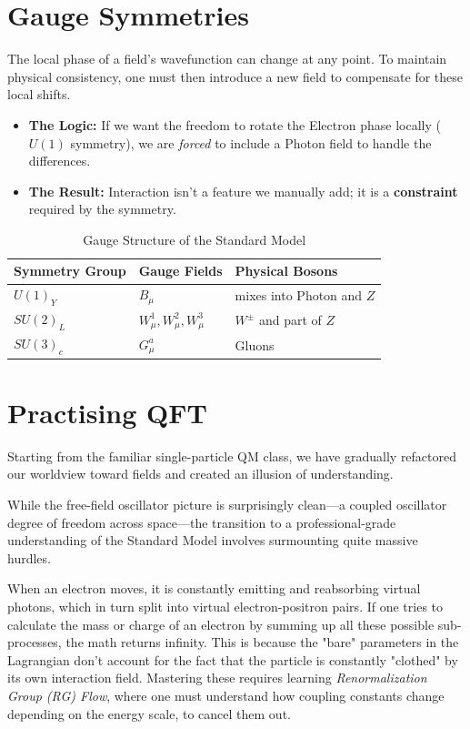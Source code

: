 \section{Gauge Symmetries}

The local phase of a field's wavefunction can change at any point.
To maintain physical consistency, one must then introduce a new field to compensate for these local shifts.

\begin{itemize}
    \item \textbf{The Logic:} If we want the freedom to rotate the Electron phase locally ($U(1)$ symmetry), we are \textit{forced} to include a Photon field to handle the differences.
    \item \textbf{The Result:} Interaction isn't a feature we manually add; it is a \textbf{constraint} required by the symmetry. 
\end{itemize}

\begin{table}[h!]
\centering
\begin{tabular}{|l|l|l|}
\hline
\textbf{Symmetry Group} & \textbf{Gauge Fields} & \textbf{Physical Bosons} \\ \hline
$U(1)_Y$ & $B_\mu$ & mixes into Photon and $Z$ \\ \hline
$SU(2)_L$ & $W^1_\mu, W^2_\mu, W^3_\mu$ & $W^\pm$ and part of $Z$ \\ \hline
$SU(3)_c$ & $G^a_\mu$ & Gluons \\ \hline
\end{tabular}
\caption{Gauge Structure of the Standard Model}
\end{table}


\section{Practising QFT}

Starting from the familiar single-particle QM class, we have gradually refactored our worldview toward fields and
created an illusion of understanding.

While the free-field oscillator picture is surprisingly clean—a coupled oscillator degree of freedom across space—the transition to a
professional-grade understanding of the Standard Model involves surmounting quite massive hurdles.

When an electron moves, it is constantly emitting and reabsorbing virtual photons, which in turn split into virtual electron-positron pairs.
If one tries to calculate the mass or charge of an electron by summing up all these possible sub-processes, the math returns infinity.
This is because the "bare" parameters in the Lagrangian don't account for the fact that the particle is constantly "clothed" by its own interaction field.
Mastering these requires learning \textit{Renormalization Group (RG) Flow}, where one must understand how coupling constants change depending on the energy scale,
to cancel them out.

